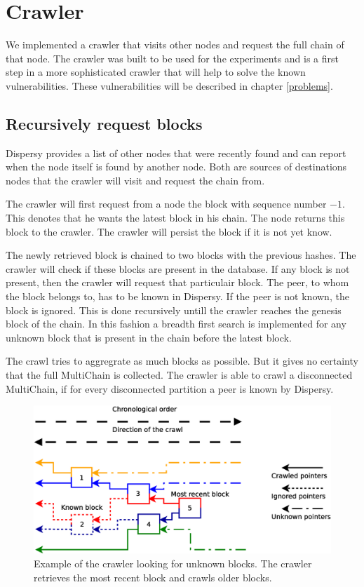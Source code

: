 \section{Crawler}
We implemented a crawler that visits other nodes and request the full chain of that node.
The crawler was built to be used for the experiments and
is a first step in a more sophisticated crawler that will help to solve the known vulnerabilities.
These vulnerabilities will be described in chapter \ref{problems}.

\subsection{Recursively request blocks}
Dispersy provides a list of other nodes that were recently found
and can report when the node itself is found by another node.
Both are sources of destinations nodes that the crawler will visit
and request the chain from.

The crawler will first request from a node the block with sequence number $-1$.
This denotes that he wants the latest block in his chain.
The node returns this block to the crawler.
The crawler will persist the block if it is not yet know.

The newly retrieved block is chained to two blocks with the previous hashes.
The crawler will check if these blocks are present in the database.
If any block is not present,
then the crawler will request that particulair block.
The peer, to whom the block belongs to, has to be known in Dispersy.
If the peer is not known, the block is ignored.
This is done recursively untill the crawler reaches the genesis block of the chain.
In this fashion a breadth first search is implemented for any unknown block
that is present in the chain before the latest block.

The crawl tries to aggregrate as much blocks as possible.
But it gives no certainty that the full MultiChain is collected.
The crawler is able to crawl a disconnected MultiChain,
if for every disconnected partition a peer is known by Dispersy.

\begin{figure}
	\centerline{\includegraphics[scale=0.3]{design/figs/crawler-version2.eps}}
	\caption{Example of the crawler looking for unknown blocks. The crawler retrieves the most recent block and crawls older blocks.}
	\label{fig:crawler-example}
\end{figure}

